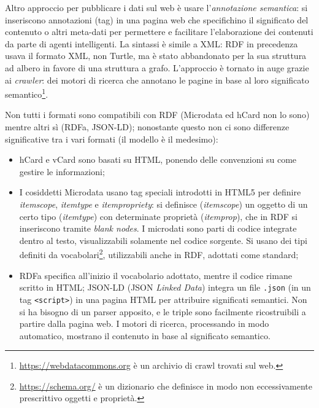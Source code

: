 \documentclass[11pt]{article}
\begin{document}
Altro approccio per pubblicare i dati sul web è usare l'\textit{annotazione semantica}: si inseriscono annotazioni (tag) in una pagina web che specifichino il significato del contenuto o altri meta-dati per permettere e facilitare l'elaborazione dei contenuti da parte di agenti intelligenti.
La sintassi è simile a XML: RDF in precedenza usava il formato XML, non Turtle, ma è stato abbandonato per la sua struttura ad albero in favore di una struttura a grafo.
L'approccio è tornato in auge grazie ai \textit{crawler}: dei motori di ricerca che annotano le pagine in base al loro significato semantico\footnote{\url{https://webdatacommons.org} è un archivio di crawl trovati sul web.}.

Non tutti i formati sono compatibili con RDF (Microdata ed hCard non lo sono) mentre altri sì (RDFa, JSON-LD); nonostante questo non ci sono differenze significative tra i vari formati (il modello è il medesimo):
\begin{itemize}
\item hCard e vCard sono basati su HTML, ponendo delle convenzioni su come gestire le informazioni;
\item I cosiddetti Microdata usano tag speciali introdotti in HTML5 per definire \textit{itemscope}, \textit{itemtype} e \textit{itempropriety}: si definisce (\textit{itemscope}) un oggetto di un certo tipo (\textit{itemtype}) con determinate proprietà (\textit{itemprop}), che in RDF si inseriscono tramite \textit{blank nodes}.
I microdati sono parti di codice integrate dentro al testo, visualizzabili solamente nel codice sorgente.
Si usano dei tipi definiti da vocabolari\footnote{\url{https://schema.org/} è un dizionario che definisce in modo non eccessivamente prescrittivo oggetti e proprietà.}, utilizzabili anche in RDF, adottati come standard;
\item RDFa specifica all'inizio il vocabolario adottato, mentre il codice rimane scritto in HTML;
JSON-LD (JSON \textit{Linked Data}) integra un file \verb|.json| (in un tag \verb|<script>|) in una pagina HTML per attribuire significati semantici.
Non si ha bisogno di un parser apposito, e le triple sono facilmente ricostruibili a partire dalla pagina web.
I motori di ricerca, processando in modo automatico, mostrano il contenuto in base al significato semantico.
\end{itemize}
\end{document}
